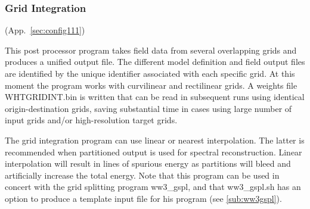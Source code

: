 \vsssub
\subsubsection{Grid Integration} \label{sub:ww3gint}
\vsssub
{}
 (App.~\ref{sec:config111})

\vspace{\baselineskip}
\noindent
This post processor program takes field data from several overlapping grids
and produces a unified output file. The different model definition and field
output files are identified by the unique identifier associated with each
specific grid. At this moment the program works with curvilinear and
rectilinear grids. A weights file {\file WHTGRIDINT.bin} is written 
that can be read in subsequent runs using identical origin-destination grids, 
saving substantial time in cases using large number of input grids and/or 
high-resolution target grids.

\vspace{\baselineskip}
\noindent
The grid integration program can use linear or nearest interpolation. The latter 
is recommended when partitioned output is used for spectral reconstruction. Linear 
interpolation will result in lines of spurious energy as partitions will bleed and 
artificially increase the total energy.
\vspace{\baselineskip}
\vspace{\baselineskip}
\noindent
Note that this program can be used in concert with the grid splitting program
{\file ww3\_gspl}, and that {\file ww3\_gspl.sh} has an option to produce a
template input file for his program (see \para\ref{sub:ww3gspl}).

\pb
